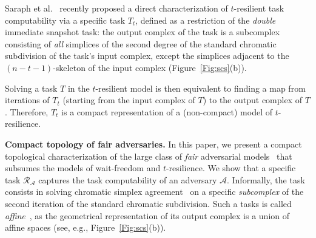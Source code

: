 \documentclass[a4paper]{article}
\newcommand{\myparagraph}[1]{\vspace{6pt}\noindent \textbf{#1}}
\def\A{\ensuremath{\mathcal{A}}}
\def\R{\ensuremath{\mathcal{R}}}
\def\fair{\textit{fair}}
\begin{document}

Saraph et al.~\cite{SHG16} recently proposed a direct characterization
of $t$-resilient %
task computability via a specific task $T_t$, defined 
as a restriction of the \emph{double} immediate snapshot
task: the output complex of the task is a subcomplex consisting of
\emph{all} simplices of the second degree of the standard chromatic
subdivision of the task's input complex, except the simplices 
adjacent to the $(n-t-1)$-skeleton of the input
complex (Figure~\ref{Fig:scs}(b)).

Solving a %
task $T$ in the  $t$-resilient model is then equivalent to finding a map from
iterations of $T_t$ (starting from the input complex of $T$) to the output complex of $T$.   
Therefore, $T_t$ is a compact representation of a (non-compact) model
of  $t$-resilience. 


\myparagraph{Compact topology of fair adversaries.}
In this paper, we present a compact topological characterization
of the large class of \emph{\fair} adversarial models~\cite{KR17}
that subsumes the models of wait-freedom and $t$-resilience. 
%
We show that a specific task
$\R_{\A}$ captures the task computability of an adversary $\A$.  
Informally, the task consists in solving chromatic simplex
agreement~\cite{BG97,HS99} on a specific \emph{subcomplex} of the second
iteration of the standard chromatic  subdivision.
Such a tasks is called \emph{affine}~\cite{GKM14-podc,GHKR16}, as
the geometrical representation of its output complex is
a union of affine spaces (see, e.g., Figure~\ref{Fig:scs}(b)).  

\end{document}
